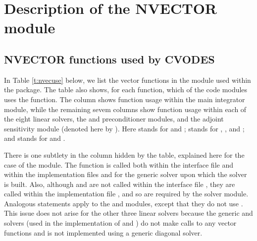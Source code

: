 \chapter{Description of the NVECTOR module}\label{s:nvector}



\section{NVECTOR functions used by CVODES}

In Table \ref{t:nvecuse} below, we list the vector functions in the 
{\nvector} module used within the {\cvodes} package.
The table also shows, for each function, which of the code modules uses
the function. The {\cvodes} column shows function usage within the main
integrator module, while the remaining sevem columns show function usage
within each of the eight {\cvodes} linear solvers, the {\cvbandpre} and
{\cvbbdpre} preconditioner modules, and the {\cvodes} adjoint sensitivity
module (denoted here by {\cvodea}).  Here {\cvdls} stands for {\cvdense} and
{\cvband}; {\cvspils} stands for {\cvspgmr}, {\cvspbcg}, and {\cvsptfqmr};
and {\cvsls} stands for {\cvklu} and {\cvsuperlumt}.

There is one subtlety in the {\cvspils} column hidden by the table, explained
here for the case of the {\cvspgmr} module. 
The  function is called both within the interface file
 and within the implementation
files  and  for the generic
{\spgmr} solver upon which the {\cvspgmr} solver is built.  Also, although
 and  are not called within the interface file
, they are called within the implementation file
, and so are required by the {\cvspgmr} solver module.
Analogous statements apply to the {\cvspbcg} and {\cvsptfqmr} modules,
except that they do not use .
This issue does not arise for the other 
three {\cvodes} linear solvers because the generic {\dense} and {\band} solvers 
(used in the implementation of {\cvdense} and {\cvband}) do not make calls to 
any vector functions and {\cvdiag} is not implemented using a generic diagonal solver. 


